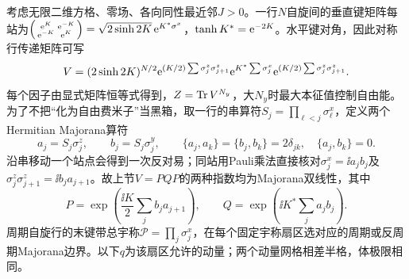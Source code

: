 \label{ch:ising2}
考虑无限二维方格、零场、各向同性最近邻$J>0$。一行$N$自旋间的垂直键矩阵每站为$\left(\begin{smallmatrix}\mathrm e^K&\mathrm e^{-K}\\\mathrm e^{-K}&\mathrm e^K\end{smallmatrix}\right)=\sqrt{2\sinh2K}\,\mathrm e^{K^*\sigma^x}$，$\tanh K^*=\mathrm e^{-2K}$。水平键对角，因此对称行传递矩阵可写
\begin{equation}
V=(2\sinh2K)^{N/2}\mathrm e^{(K/2)\sum\sigma_j^z\sigma_{j+1}^z}\mathrm e^{K^*\sum\sigma_j^x}\mathrm e^{(K/2)\sum\sigma_j^z\sigma_{j+1}^z}.
\end{equation}
每个因子由显式矩阵恒等式得到，$Z=\operatorname{Tr} V^{N_y}$，大$N_y$时最大本征值控制自由能。
为了不把“化为自由费米子”当黑箱，取一行的串算符$S_j=\prod_{\ell<j}\sigma_\ell^x$，定义两个Hermitian Majorana算符
\begin{equation}
a_j=S_j\sigma_j^z,\qquad b_j=S_j\sigma_j^y,
\qquad\{a_j,a_k\}=\{b_j,b_k\}=2\delta_{jk},\quad\{a_j,b_k\}=0.
\end{equation}
沿串移动一个站点会得到一次反对易；同站用Pauli乘法直接核对$\sigma_j^x=\ii a_jb_j$及$\sigma_j^z\sigma_{j+1}^z=\ii b_ja_{j+1}$。故上节$V=PQP$的两种指数均为Majorana双线性，其中
\begin{equation}
P=\exp\!\left(\frac{\ii K}{2}\sum_jb_ja_{j+1}\right),\qquad
Q=\exp\!\left(\ii K^*\sum_ja_jb_j\right).
\end{equation}
周期自旋行的末键带总宇称$\mathcal P=\prod_j\sigma_j^x$，在每个固定宇称扇区选对应的周期或反周期Majorana边界。以下$q$为该扇区允许的动量；两个动量网格相差半格，体极限相同。

